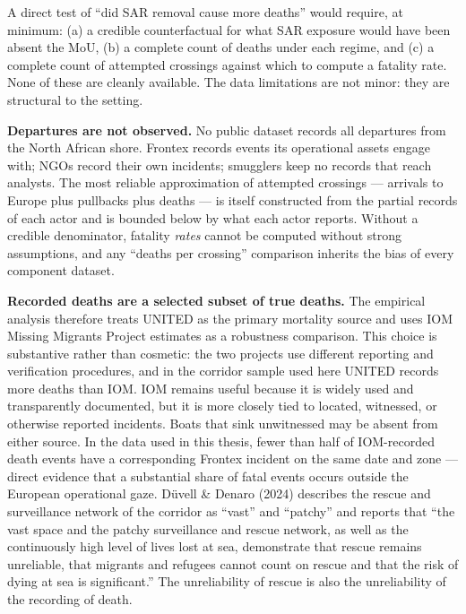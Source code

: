 \documentclass[
  11pt,
  a4paper,
]{article}
\begin{document}
A direct test of ``did SAR removal cause more deaths'' would require, at
minimum: (a) a credible counterfactual for what SAR exposure would have
been absent the MoU, (b) a complete count of deaths under each regime,
and (c) a complete count of attempted crossings against which to compute
a fatality rate. None of these are cleanly available. The data
limitations are not minor: they are structural to the setting.

\textbf{Departures are not observed.} No public dataset records all
departures from the North African shore. Frontex records events its
operational assets engage with; NGOs record their own incidents;
smugglers keep no records that reach analysts. The most reliable
approximation of attempted crossings --- arrivals to Europe plus
pullbacks plus deaths --- is itself constructed from the partial records
of each actor and is bounded below by what each actor reports. Without a
credible denominator, fatality \emph{rates} cannot be computed without
strong assumptions, and any ``deaths per crossing'' comparison inherits
the bias of every component dataset.

\textbf{Recorded deaths are a selected subset of true deaths.} The
empirical analysis therefore treats UNITED as the primary mortality
source and uses IOM Missing Migrants Project estimates as a robustness
comparison. This choice is substantive rather than cosmetic: the two
projects use different reporting and verification procedures, and in the
corridor sample used here UNITED records more deaths than IOM. IOM
remains useful because it is widely used and transparently documented,
but it is more closely tied to located, witnessed, or otherwise reported
incidents. Boats that sink unwitnessed may be absent from either source.
In the data used in this thesis, fewer than half of IOM-recorded death
events have a corresponding Frontex incident on the same date and zone
--- direct evidence that a substantial share of fatal events occurs
outside the European operational gaze. Düvell \& Denaro (2024) describes
the rescue and surveillance network of the corridor as ``vast'' and
``patchy'' and reports that ``the vast space and the patchy surveillance
and rescue network, as well as the continuously high level of lives lost
at sea, demonstrate that rescue remains unreliable, that migrants and
refugees cannot count on rescue and that the risk of dying at sea is
significant.'' The unreliability of rescue is also the unreliability of
the recording of death.
\end{document}
